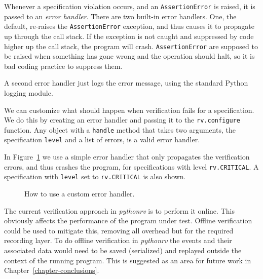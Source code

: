 Whenever a specification violation occurs, and an \texttt{AssertionError} is
raised, it is passed to an \textit{error handler}. There are two built-in error
handlers. One, the default, re-raises the \texttt{AssertionError} exception,
and thus causes it to propagate up through the call stack. If the exception
is not caught and suppressed by code higher up the call stack, the program will
crash. \texttt{AssertionError} are supposed to be raised when something has
gone wrong and the operation should halt, so it is bad coding practice to
suppress them.

A second error handler just logs the error message, using the standard Python
logging module.

We can customize what should happen when verification fails for a
specification. We do this by creating an error handler and passing it to the
\texttt{rv.configure} function. Any object with a \texttt{handle} method that
takes two arguments, the specification \texttt{level} and a list of errors, is
a valid error handler.

In Figure~\ref{figure-configure-error-handler} we use a simple error handler
that only propagates the verification errors, and thus crashes the program, for
specifications with level \texttt{rv.CRITICAL}. A specification with
\texttt{level} set to \texttt{rv.CRITICAL} is also shown.

\begin{figure}[h!]
	\begin{center}
	\begin{minipage}{0.7\textwidth}
	
	\end{minipage}
	\end{center}

  \caption{How to use a custom error handler.}
	\label{figure-configure-error-handler}
\end{figure}

The current verification approach in \textit{pythonrv} is to perform it online.
This obviously affects the performance of the program under test. Offline
verification could be used to mitigate this, removing all overhead but for the
required recording layer. To do offline verification in \textit{pythonrv} the
events and their associated data would need to be saved (serialized) and
replayed outside the context of the running program. This is suggested as an
area for future work in Chapter~\ref{chapter-conclusions}.






